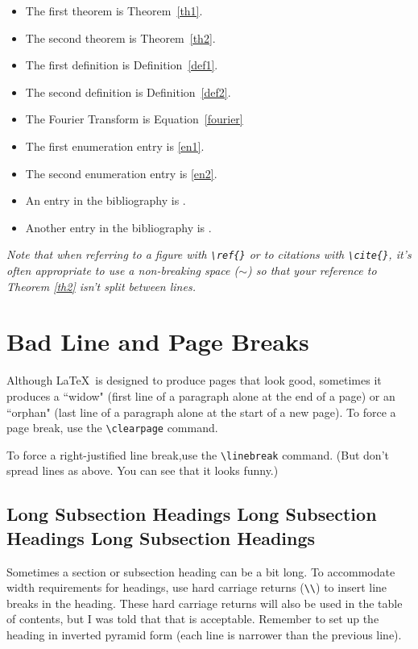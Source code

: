 \begin{itemize}
\item
The first theorem is Theorem~\ref{th1}.

\item
The second theorem is Theorem~\ref{th2}.

\item
The first definition is Definition~\ref{def1}.

\item
The second definition is Definition~\ref{def2}.

\item
The Fourier Transform is Equation~\ref{fourier}

\item
The first enumeration entry is \ref{en1}.

\item
The second enumeration entry is \ref{en2}.

\item
An entry in the bibliography is \cite{bib1}.

\item
Another entry in the bibliography is \cite{bib2}.

\nocite{bib3}

\end{itemize}

{\em Note that when referring to a figure with \verb+\ref{}+ or to
citations with \verb+\cite{}+, it's often appropriate to use a
non-breaking space ($\sim$) so that your reference to Theorem \ref{th2} isn't split between lines.
}


\section{Bad Line and Page Breaks}

Although \LaTeX \ is designed to produce pages that look good,
sometimes it produces a ``widow" (first line of a paragraph
alone at the end of a page) or an ``orphan"
(last line of a paragraph alone at the start of a new page).
To force a page break, use the
\verb+\clearpage+ command.

To force a right-justified line break,\linebreak use the
\verb+\linebreak+ command.
(But don't spread lines as above. You can see that it looks funny.)



\subsection{Long Subsection Headings 
Long Subsection \\
Headings 
Long Subsection Headings
}


Sometimes a section or subsection heading can be a bit long.
To accommodate width requirements for headings, 
use hard carriage returns (\verb+\\+)
to insert line breaks in the heading. These hard carriage returns 
will also be used in the table of contents, but 
I was told that that is acceptable. 
Remember to set up the heading in inverted pyramid form
(each line is narrower than the previous line).



